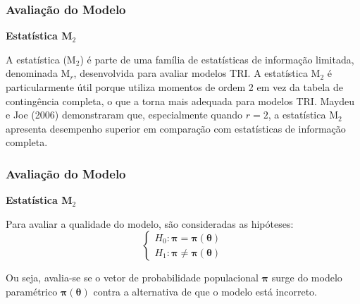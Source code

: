 \documentclass{beamer}
\begin{document}
\begin{frame}
		
		\frametitle{Avaliação do Modelo}
		
		\begin{center}
			\textbf{Estatística M$_2$} 
		\end{center}
		
	A estatística (M$_2$) é parte de uma família de estatísticas de informação limitada, denominada M$_r$, desenvolvida para avaliar modelos TRI. \newline 
	A estatística M$_2$ é particularmente útil porque utiliza momentos de ordem 2 em vez da tabela de contingência completa, o que a torna mais adequada para modelos TRI. \newline 
	Maydeu e Joe (2006)  demonstraram que, especialmente quando $r=2$, a estatística M$_2$ apresenta desempenho superior em comparação com estatísticas de informação completa. 
		
\end{frame}		

\begin{frame}
	
	\frametitle{Avaliação do Modelo}
	
	\begin{center}
		\textbf{Estatística M$_2$} 
	\end{center}
	
		Para avaliar a qualidade do modelo, são consideradas as hipóteses:
		\[
		\begin{cases}
			H_0: \boldsymbol{\pi} = \boldsymbol{\pi}(\boldsymbol{\theta}) \\
			
			H_1: \boldsymbol{\pi} \neq \boldsymbol{\pi}(\boldsymbol{\theta})
		\end{cases}
		\]

	Ou seja, avalia-se se o vetor de probabilidade populacional $\boldsymbol{\pi}$ surge do modelo paramétrico $\boldsymbol{\pi}(\boldsymbol{\theta})$ contra a alternativa de que o modelo está incorreto.
	
\end{frame}	
\end{document}

